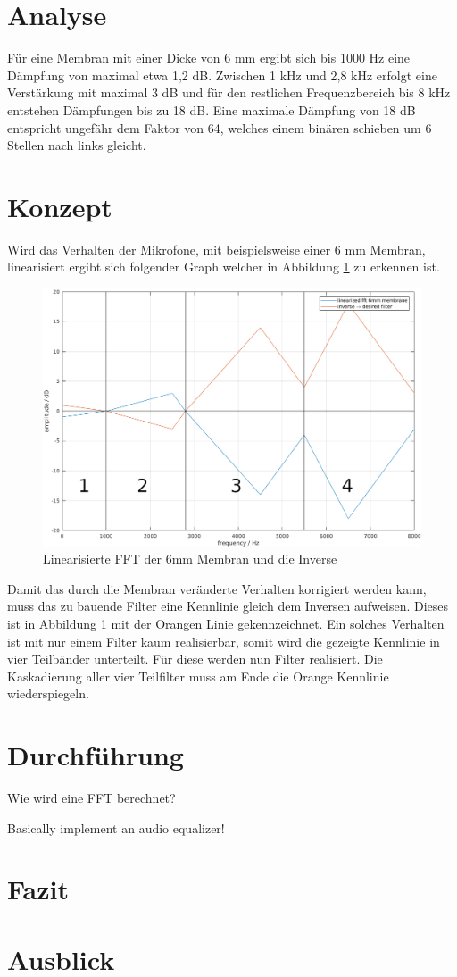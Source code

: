 \section{Analyse}

Für eine Membran mit einer Dicke von 6 mm ergibt sich bis 1000 Hz eine Dämpfung von maximal etwa 1,2 dB. Zwischen 1 kHz und 2,8 kHz erfolgt eine Verstärkung mit maximal 3 dB und für den restlichen Frequenzbereich bis 8 kHz entstehen Dämpfungen bis zu 18 dB. Eine maximale Dämpfung von 18 dB entspricht ungefähr dem Faktor von 64, welches einem binären schieben um 6 Stellen nach links gleicht.

\section{Konzept}

Wird das Verhalten der Mikrofone, mit beispielsweise einer 6 mm Membran, linearisiert ergibt sich folgender Graph welcher in Abbildung \ref{fig:matlab1} zu erkennen ist.

\begin{figure}[H]
	\centering
	\includegraphics[width=0.9\linewidth]{../../filter_design/matlab/matlab_1}
	\caption{Linearisierte FFT der 6mm Membran und die Inverse}
	\label{fig:matlab1}
\end{figure}

Damit das durch die Membran veränderte Verhalten korrigiert werden kann, muss das zu bauende Filter eine Kennlinie gleich dem Inversen aufweisen. Dieses ist in Abbildung \ref{fig:matlab1} mit der Orangen Linie gekennzeichnet. Ein solches Verhalten ist mit nur einem Filter kaum realisierbar, somit wird die gezeigte Kennlinie in vier Teilbänder unterteilt. Für diese werden nun Filter realisiert. Die Kaskadierung aller vier Teilfilter muss am Ende die Orange Kennlinie wiederspiegeln.


\newpage
\section{Durchführung}

Wie wird eine FFT berechnet?

Basically implement an audio equalizer!

\newpage
\section{Fazit}


\newpage
\section{Ausblick}
